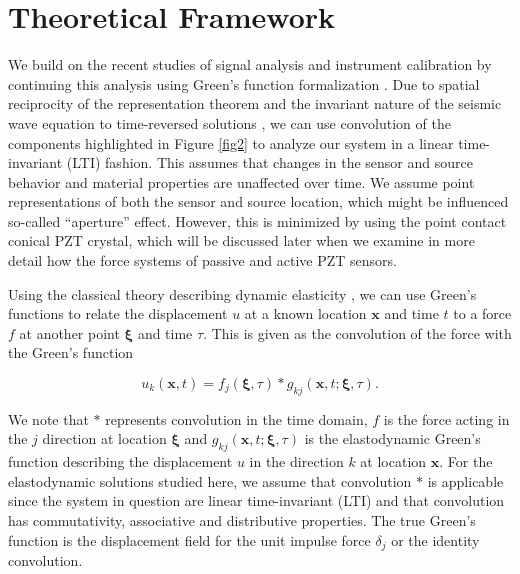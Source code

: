 \documentclass[preprint,3p, 11pt,authoryear]{elsarticle}
\begin{document}
\section{Theoretical Framework}
\label{theo}

We build on the recent studies of signal analysis and instrument calibration by \citet{McLaskey2012} continuing this analysis using Green's function formalization \citep{Aki2002, Johnson1974}. Due to spatial reciprocity of the representation theorem \citep{Aki2002} and the invariant nature of the seismic wave equation to time-reversed solutions \citep{Fink1992}, we can use convolution of the components highlighted in Figure \ref{fig2} to analyze our system in a linear time-invariant (LTI) fashion. This assumes that changes in the sensor and source behavior and material properties are unaffected over time.  We assume point representations of both the sensor and source location, which might be influenced so-called ``aperture'' effect. However, this is minimized by using the point contact conical PZT crystal, which will be discussed later when we examine in more detail how the force systems of passive and active PZT sensors.

Using the classical theory describing dynamic elasticity \citep{Aki2002}, we can use Green's functions to relate the displacement $u$ at a known location $\mathbf{x}$ and time $t$ to a force $f$ at another point $\mathbf{\xi}$ and time $\tau$. This is given as the convolution of the force with the Green's function

\begin{equation}
\label{eq1}
           u_{k}\left( \mathbf{x}, t \right)  =  
            f_{j}\left( \mathbf{\xi}, \tau \right) \ast 
            g_{kj}\left( \mathbf{x}, t;\mathbf{\xi}, \tau \right).
\end{equation}

\noindent We note that $\ast$ represents convolution in the time domain, $f$ is the force acting in the $j$ direction at location $\mathbf{\xi}$ and $g_{kj}\left( \mathbf{x}, t;\mathbf{\xi}, \tau \right)$ is the elastodynamic Green's function describing the displacement $u$ in the direction $k$ at location $\mathbf{x}$. For the elastodynamic solutions studied here, we assume that convolution $\ast$ is applicable since the system in question are linear time-invariant (LTI) and that convolution has commutativity, associative and distributive properties. The true Green's function is the displacement field for the unit impulse force $\delta_{j}$ or the identity convolution. 
\end{document}
